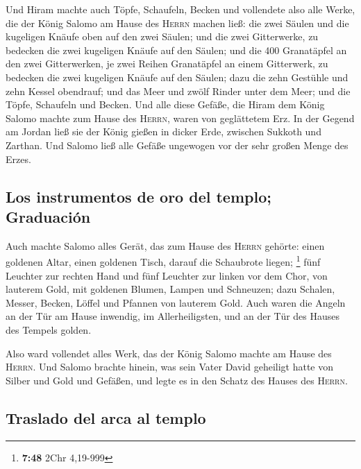  Und Hiram machte auch Töpfe, Schaufeln, Becken und
vollendete also alle Werke, die der König Salomo am Hause des
\textsc{Herrn} machen ließ:  die zwei Säulen und die
kugeligen Knäufe oben auf den zwei Säulen; und die zwei Gitterwerke, zu
bedecken die zwei kugeligen Knäufe auf den Säulen;  und
die 400 Granatäpfel an den zwei Gitterwerken, je zwei Reihen Granatäpfel
an einem Gitterwerk, zu bedecken die zwei kugeligen Knäufe auf den
Säulen;  dazu die zehn Gestühle und zehn Kessel
obendrauf;  und das Meer und zwölf Rinder unter dem Meer;
 und die Töpfe, Schaufeln und Becken. Und alle diese
Gefäße, die Hiram dem König Salomo machte zum Hause des \textsc{Herrn},
waren von geglättetem Erz.  In der Gegend am Jordan ließ
sie der König gießen in dicker Erde, zwischen Sukkoth und Zarthan.
 Und Salomo ließ alle Gefäße ungewogen vor der sehr
großen Menge des Erzes.

\hypertarget{los-instrumentos-de-oro-del-templo-graduaciuxf3n}{%
\subsection{Los instrumentos de oro del templo;
Graduación}\label{los-instrumentos-de-oro-del-templo-graduaciuxf3n}}

 Auch machte Salomo alles Gerät, das zum Hause des
\textsc{Herrn} gehörte: einen goldenen Altar, einen goldenen Tisch,
darauf die Schaubrote liegen; \footnote{\textbf{7:48} 2Chr 4,19-999}
 fünf Leuchter zur rechten Hand und fünf Leuchter zur
linken vor dem Chor, von lauterem Gold, mit goldenen Blumen, Lampen und
Schneuzen;  dazu Schalen, Messer, Becken, Löffel und
Pfannen von lauterem Gold. Auch waren die Angeln an der Tür am Hause
inwendig, im Allerheiligsten, und an der Tür des Hauses des Tempels
golden.

 Also ward vollendet alles Werk, das der König Salomo
machte am Hause des \textsc{Herrn}. Und Salomo brachte hinein, was sein
Vater David geheiligt hatte von Silber und Gold und Gefäßen, und legte
es in den Schatz des Hauses des \textsc{Herrn}.

\hypertarget{traslado-del-arca-al-templo}{%
\subsection{Traslado del arca al
templo}\label{traslado-del-arca-al-templo}}

